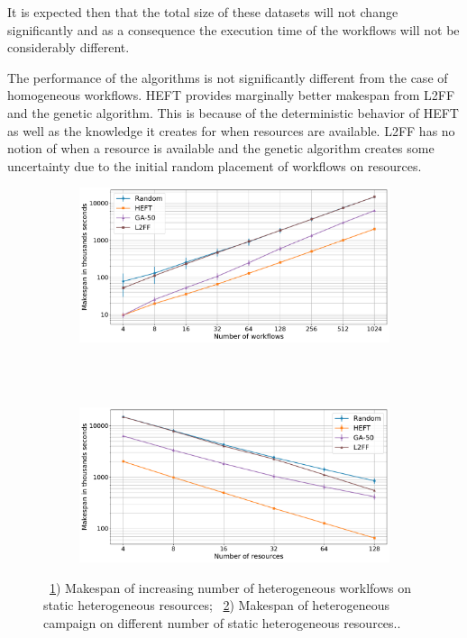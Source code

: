 It is expected then that the total size of these datasets will not change significantly and as a consequence the execution time of the workflows will not be considerably different.

The performance of the algorithms is not significantly different from the case of homogeneous workflows.
HEFT provides marginally better makespan from L2FF and the genetic algorithm.
This is because of the deterministic behavior of HEFT as well as the knowledge it creates for when resources are available.
L2FF has no notion of when a resource is available and the genetic algorithm creates some uncertainty due to the initial random placement of workflows on resources.


\begin{figure}[ht!]
    \centering
    \begin{subfigure}[b]{0.85\textwidth}
        \includegraphics[width=.95\textwidth]{figures/campaign/StHeteroCampaigns_4StHeteroResources.pdf}
        \caption{}
        \label{fig:StHeteroCampaigns_4StHeteroResources}
    \end{subfigure}\\
    ~ 
    \begin{subfigure}[b]{0.85\textwidth}
        \includegraphics[width=.95\textwidth]{figures/campaign/StHeteroResources_StHeteroCampaigns.pdf}
        \caption{}
        \label{fig:StHeteroResources_StHeteroCampaigns}
    \end{subfigure}
    \caption{~\ref{fig:StHeteroCampaigns_4StHeteroResources}) Makespan of increasing number of heterogeneous worklfows on static heterogeneous resources;
        ~\ref{fig:StHeteroResources_StHeteroCampaigns}) Makespan of heterogeneous campaign on different number of static heterogeneous resources..}
    \label{fig:heter_analysis}
\end{figure}

